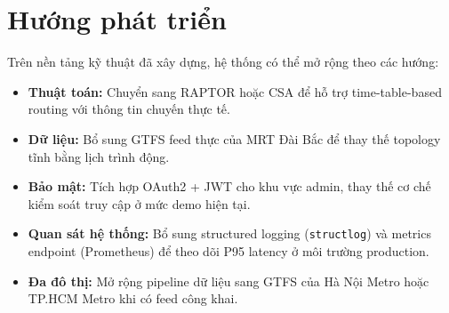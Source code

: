 ﻿\documentclass[../DoAn.tex]{subfiles}
\begin{document}
\section{Hướng phát triển}
Trên nền tảng kỹ thuật đã xây dựng, hệ thống có thể mở rộng theo các hướng:
\begin{itemize}
    \item \textbf{Thuật toán:} Chuyển sang RAPTOR \cite{delling2015raptor} hoặc CSA \cite{dibbelt2018connection} để hỗ trợ time-table-based routing với thông tin chuyến thực tế.
    \item \textbf{Dữ liệu:} Bổ sung GTFS feed thực của MRT Đài Bắc để thay thế topology tĩnh bằng lịch trình động.
    \item \textbf{Bảo mật:} Tích hợp OAuth2 + JWT cho khu vực admin, thay thế cơ chế kiểm soát truy cập ở mức demo hiện tại.
    \item \textbf{Quan sát hệ thống:} Bổ sung structured logging (\texttt{structlog}) và metrics endpoint (Prometheus) để theo dõi P95 latency ở môi trường production.
    \item \textbf{Đa đô thị:} Mở rộng pipeline dữ liệu sang GTFS của Hà Nội Metro hoặc TP.HCM Metro khi có feed công khai.
\end{itemize}
\end{document}
